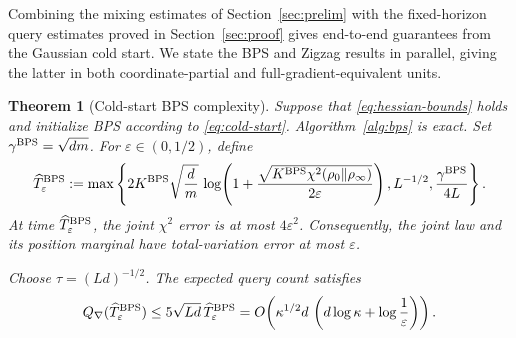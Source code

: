 \documentclass{amsart}
\theoremstyle{plain}
\newtheorem{theorem}{Theorem}
\theoremstyle{definition}
\theoremstyle{remark}
\newcommand{\1}{\mathbf 1}
\newcommand{\bps}{{\rm BPS}}
\begin{document}
Combining the mixing estimates of Section~\ref{sec:prelim} with the
fixed-horizon query estimates proved in Section~\ref{sec:proof} gives
end-to-end guarantees from the Gaussian cold start.  We state the BPS and
Zigzag results in parallel, giving the latter in both coordinate-partial and
full-gradient-equivalent units.

\begin{theorem}[Cold-start BPS complexity]\label{thm:main}
Suppose that \eqref{eq:hessian-bounds} holds and initialize BPS according to
\eqref{eq:cold-start}.  Algorithm~\ref{alg:bps} is exact.  Set
$\gamma^{\bps}=\sqrt{dm}$.  For $\varepsilon\in(0,1/2)$, define
\begin{equation}\label{eq:bps-horizon}
        \widehat T_\varepsilon^{\bps}
        :=\max\left\{
          2K^{\bps}\sqrt{\frac dm}\,
          \log\!\left(
            1+\frac{\sqrt{K^{\bps}\chi^2(\rho_0\Vert\rho_\infty)}}
                     {2\varepsilon}\right),
          L^{-1/2},\frac{\gamma^{\bps}}{4L}\right\}.
\end{equation}
At time $\widehat T_\varepsilon^{\bps}$, the joint $\chi^2$ error is at most
$4\varepsilon^2$.  Consequently, the joint law and its position marginal
have total-variation error at most $\varepsilon$.

Choose $\tau=(Ld)^{-1/2}$.  The expected query count satisfies
\begin{equation}\label{eq:main-cold}
        Q_\nabla(\widehat T_\varepsilon^{\bps})
        \le 5\sqrt{Ld}\,\widehat T_\varepsilon^{\bps}
        =O\!\left(\kappa^{1/2}d\,
          \left(d\log\kappa+\log\frac1\varepsilon\right)\right).
\end{equation}
\end{theorem}
\end{document}
